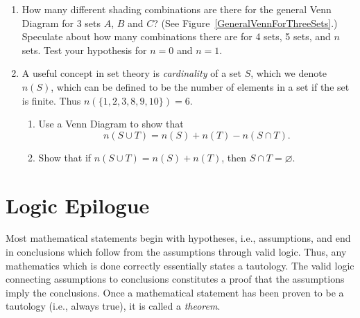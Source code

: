 \begin{multicols}{2}
\begin{enumerate}
\item How many different shading combinations are there for 
the general Venn Diagram for 3 sets $A$, $B$ and $C$?
(See Figure~\ref{GeneralVennForThreeSets}.)  Speculate
about how many combinations there are for 4 sets, 5 sets,
and $n$ sets.  Test your hypothesis for $n=0$ and $n=1$.


\item A useful concept in set theory is {\it cardinality}
of a set $S$, which we denote $n(S)$, which can 
be defined to be the number of elements
in a set if the set is finite.
Thus $n(\{1,2,3,8,9,10\})=6$.
\begin{enumerate}
\item Use a Venn Diagram to show that
\begin{equation}n(S\cup T)=n(S)+n(T)-n(S\cap T).
\end{equation}
\item Show that if $n(S\cup T)=n(S)+n(T)$, then
$S\cap T=\varnothing$.
\end{enumerate}
\label{CardinalityHomework}
\end{enumerate}

\end{multicols}
\newpage





\section{Logic Epilogue\label{LogicEpilogue}}

Most mathematical statements begin with hypotheses,
i.e., assumptions,  
and end in conclusions which follow from the assumptions 
through valid logic.  
Thus, any mathematics which is done correctly
essentially states a tautology. 
The valid logic connecting 
assumptions to conclusions constitutes a proof
that the assumptions imply the conclusions.
Once a mathematical statement has been proven 
to be a tautology (i.e., always true), it is called a 
{\it theorem}.\footnotemark
{}\hphantom{. }%

